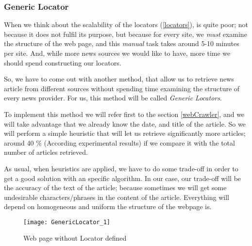 \subsubsection{Generic Locator}\label{genericLocator}

When we think about the scalability of the locators (\ref{locators}), is quite poor; not because it does not fulfil its purpose, but because for every site, we \emph{must} examine the structure of the web page, and this \emph{manual} task takes around 5-10 minutes per site. And, while more news sources we would like to have, more time we should spend constructing our locators. 

So, we have to come out with another method, that allow us to retrieve news article from different sources without spending time examining the structure of every news provider. For us, this method will be called \emph{Generic Locators}. 

To implement this method we will refer first to the section \ref{webCrawler}, and we will take advantage that we already know the date, and title of the article. So we will perform a simple heuristic that will let us retrieve significantly more articles; around 40 \% (According experimental results) if we compare it with the total number of articles retrieved.

As usual, when heuristics are applied, we have to do some trade-off in order to get a good solution with an specific algorithm. In our case, our trade-off will be the accuracy of the text of the article; because sometimes we will get some undesirable characters/phrases in the content of the article. Everything will depend on homogeneous and uniform the structure of the webpage is.

\begin{figure}\centering
	\texttt{[image: GenericLocator\_1]}
	\caption{Web page without Locator defined}\label{fig:GL_1}
\end{figure}


